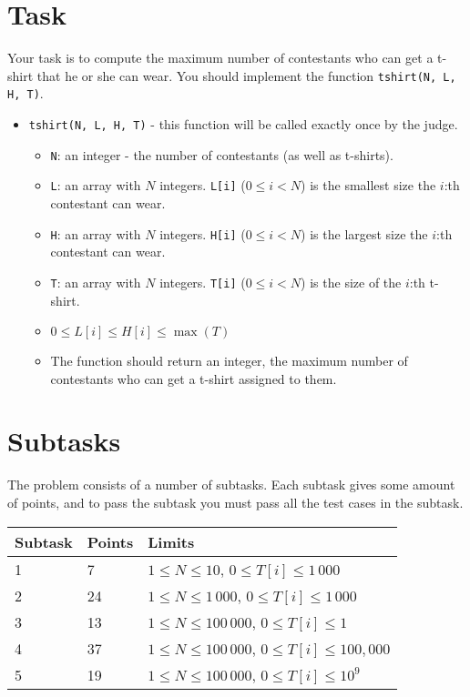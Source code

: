 \section*{Task}
Your task is to compute the maximum number of contestants who can get a t-shirt that he or she can wear.
You should implement the function \texttt{tshirt(N, L, H, T)}.
\begin{itemize}
  \item \texttt{tshirt(N, L, H, T)} - this function will be called exactly once by the judge.
  \begin{itemize}
    \item \texttt{N}: an integer - the number of contestants (as well as t-shirts).
    \item \texttt{L}: an array with $N$ integers. \texttt{L[i]} ($0 \le i < N$) is the smallest size the $i$:th contestant can wear.
    \item \texttt{H}: an array with $N$ integers. \texttt{H[i]} ($0 \le i < N$) is the largest size the $i$:th contestant can wear.
    \item \texttt{T}: an array with $N$ integers. \texttt{T[i]} ($0 \le i < N$) is the size of the $i$:th t-shirt.
    \item $0 \le L[i] \le H[i] \le \max(T)$
    \item The function should return an integer, the maximum number of contestants who can get a t-shirt assigned to them.
  \end{itemize}
\end{itemize}

\section*{Subtasks}
The problem consists of a number of subtasks. Each subtask gives some amount of points, and to pass
the subtask you must pass all the test cases in the subtask.

\begin{tabular}{|l|l|l|}
  \hline
  \textbf{Subtask} & \textbf{Points} & \textbf{Limits} \\ \hline
  1 & 7 & $1 \le N \le 10$, $0 \le T[i] \le 1\,000$ \\ \hline
  2 & 24 & $1 \le N \le 1\,000$, $0 \le T[i] \le 1\,000$ \\ \hline
  3 & 13 & $1 \le N \le 100\,000$, $0 \le T[i] \le 1$ \\ \hline
  4 & 37 & $1 \le N \le 100\,000$, $0 \le T[i] \le 100,000$ \\ \hline
  5 & 19 & $1 \le N \le 100\,000$, $0 \le T[i] \le 10^9$ \\ \hline
\end{tabular}

